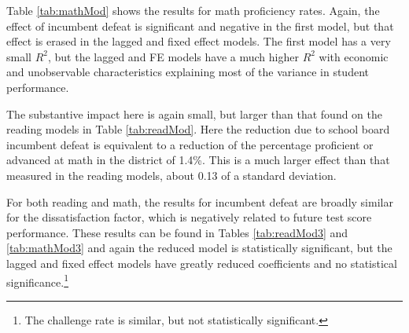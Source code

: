 Table \ref{tab:mathMod} shows the results for math proficiency rates. Again, 
the effect of incumbent defeat is significant and negative in the first model, 
but that effect is erased in the lagged and fixed effect models. The first model 
has a very small $R^{2}$, but the lagged and FE models have a much higher $R^{2}$ 
with economic and unobservable characteristics explaining most of the variance 
in student performance. 

The substantive impact here is again small, but larger than that found on the reading 
models in Table \ref{tab:readMod}. Here the reduction due to school 
board incumbent defeat is equivalent to a reduction of the percentage proficient 
or advanced at math in the district of 1.4\%. This is a much larger effect than 
that measured in the reading models, about 0.13 of a standard deviation. 

For both reading and math, the results for incumbent defeat are broadly similar 
for the dissatisfaction factor, which is negatively related to future test 
score performance. These results can be found in Tables \ref{tab:readMod3} and 
\ref{tab:mathMod3} and again the reduced model is statistically significant, 
but the lagged and fixed effect models have greatly reduced coefficients and 
no statistical significance.\footnote{The challenge rate is similar, but not 
statistically significant.}

